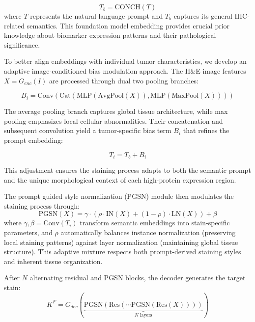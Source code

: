 \documentclass[journal,twoside,web]{ieeecolor}
\begin{document}
\begin{equation}
    T_b = \text{CONCH}(T)
\end{equation}
where $T$ represents the natural language prompt and $T_b$ captures its general IHC-related semantics. This foundation model embedding provides crucial prior knowledge about biomarker expression patterns and their pathological significance.

To better align embeddings with individual tumor characteristics, we develop an adaptive image-conditioned bias modulation approach. The H\&E image features $X = G_{enc}(I)$ are processed through dual two pooling branches:

\begin{equation}
    B_i = \text{Conv}(\text{Cat}(\text{MLP}(\text{AvgPool}(X)),\text{MLP}(\text{MaxPool}(X))))
\end{equation}


The average pooling branch captures global tissue architecture, while max pooling emphasizes local cellular abnormalities. Their concatenation and subsequent convolution yield a tumor-specific bias term $B_i$ that refines the prompt embedding:

\begin{equation}
    T_i = T_b + B_i
\end{equation}

{This adjustment ensures the staining process adapts to both the semantic prompt and the unique morphological context of each high-protein expression region.}

The prompt guided style normalization (PGSN) module then modulates the staining process through:
\begin{equation}
    \text{PGSN}(X) = \gamma \cdot (\rho\cdot\text{IN}(X) + (1-\rho)\cdot\text{LN}(X)) + \beta
\end{equation}
where $\gamma,\beta = \text{Conv}(T_i)$ transform semantic embeddings into stain-specific parameters, and $\rho$ automatically balances instance normalization (preserving local staining patterns) against layer normalization (maintaining global tissue structure). This adaptive mixture respects both prompt-derived staining styles and inherent tissue organization.


After $N$ alternating residual and PGSN blocks, the decoder generates the target stain:
\begin{equation}
    K^F = G_{dec}(\underbrace{\text{PGSN}(\text{Res}(\cdots\text{PGSN}(\text{Res}(X))))}_{N \text{ layers}})
\end{equation}
\end{document}
